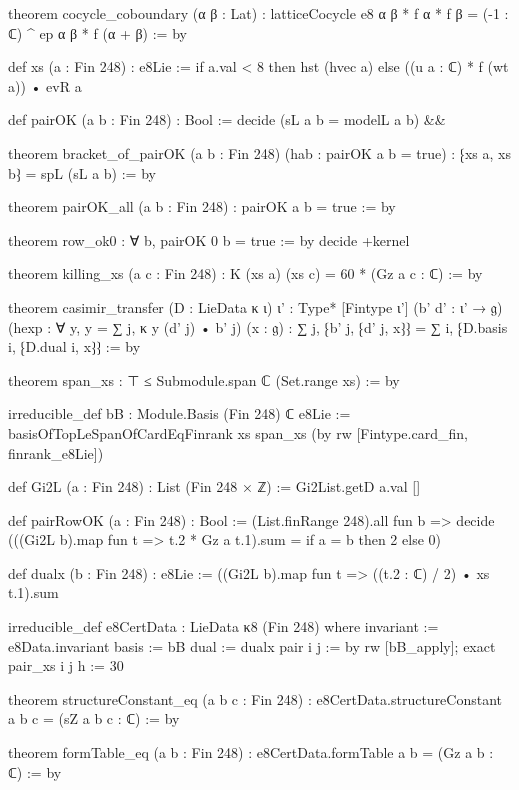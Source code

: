 \begin{leancode}
theorem cocycle_coboundary (α β : Lat) :
    latticeCocycle e8 α β * f α * f β = (-1 : ℂ) ^ ep α β * f (α + β) := by

def xs (a : Fin 248) : e8Lie :=
  if a.val < 8 then hst (hvec a) else ((u a : ℂ) * f (wt a)) • evR a

def pairOK (a b : Fin 248) : Bool :=
  decide (sL a b = modelL a b) &&

theorem bracket_of_pairOK (a b : Fin 248) (hab : pairOK a b = true) :
    ⁅xs a, xs b⁆ = spL (sL a b) := by

theorem pairOK_all (a b : Fin 248) : pairOK a b = true := by

theorem row_ok0 : ∀ b, pairOK 0 b = true := by decide +kernel

theorem killing_xs (a c : Fin 248) : K (xs a) (xs c) = 60 * (Gz a c : ℂ) := by

theorem casimir_transfer (D : LieData κ ι) {ι' : Type*} [Fintype ι'] (b' d' : ι' → 𝔤)
    (hexp : ∀ y, y = ∑ j, κ y (d' j) • b' j) (x : 𝔤) :
    ∑ j, ⁅b' j, ⁅d' j, x⁆⁆ = ∑ i, ⁅D.basis i, ⁅D.dual i, x⁆⁆ := by

theorem span_xs : ⊤ ≤ Submodule.span ℂ (Set.range xs) := by

irreducible_def bB : Module.Basis (Fin 248) ℂ e8Lie :=
  basisOfTopLeSpanOfCardEqFinrank xs span_xs (by rw [Fintype.card_fin, finrank_e8Lie])

def Gi2L (a : Fin 248) : List (Fin 248 × ℤ) := Gi2List.getD a.val []

def pairRowOK (a : Fin 248) : Bool :=
  (List.finRange 248).all fun b => decide (((Gi2L b).map fun t => t.2 * Gz a t.1).sum = if a = b then 2 else 0)

def dualx (b : Fin 248) : e8Lie := ((Gi2L b).map fun t => ((t.2 : ℂ) / 2) • xs t.1).sum

irreducible_def e8CertData : LieData κ8 (Fin 248) where
  invariant := e8Data.invariant
  basis := bB
  dual := dualx
  pair i j := by rw [bB_apply]; exact pair_xs i j
  h := 30

theorem structureConstant_eq (a b c : Fin 248) :
    e8CertData.structureConstant a b c = (sZ a b c : ℂ) := by

theorem formTable_eq (a b : Fin 248) : e8CertData.formTable a b = (Gz a b : ℂ) := by
\end{leancode}

